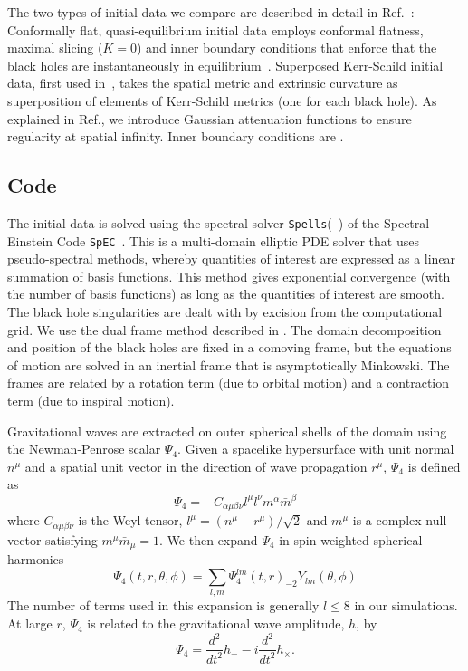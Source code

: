 The two types of initial data we compare are described in detail in
Ref.~\cite{Lovelace2008}: Conformally flat, quasi-equilibrium initial
data employs conformal flatness, maximal slicing ($K=0$) and inner
boundary conditions that enforce that the black holes are
instantaneously in
equilibrium~\cite{Caudill-etal:2006,Cook2004,Cook2002}.  Superposed
Kerr-Schild initial data, first used
in~\cite{Marronetti-Matzner:2000,Matzner1999}, takes the spatial
metric and extrinsic curvature as superposition of elements of
Kerr-Schild metrics (one for each black hole).  As explained in
Ref.\cite{Lovelace2008}, we introduce Gaussian attenuation functions
to ensure regularity at spatial infinity.  Inner boundary conditions
are .



\subsection{Code}
\label{sec:Code}

The initial data is solved using the spectral solver {\tt Spells}(~\cite{Pfeiffer2003}) of the Spectral 
 Einstein Code {\tt SpEC}~\cite{SXSWebsite}.  This is a
multi-domain elliptic PDE solver that uses pseudo-spectral methods,
whereby quantities of interest are expressed as a linear summation of
basis functions. This method gives exponential convergence (with the
number of basis functions) as long as the quantities of interest are
smooth. The black hole singularities are dealt with by excision from
the computational grid. We use the dual frame method described in
\cite{Scheel2006}. The domain decomposition and position of the black
holes are fixed in a comoving frame, but the equations of motion are
solved in an inertial frame that is asymptotically Minkowski. The
frames are related by a rotation term (due to orbital motion) and a
contraction term (due to inspiral motion).

Gravitational waves are extracted on outer spherical shells of the
domain using the Newman-Penrose scalar $\Psi_4$. Given a spacelike
hypersurface with unit normal $n^{\mu}$ and a spatial unit vector in
the direction of wave propagation $r^{\mu}$, $\Psi_4$ is defined as 
\begin{equation}
\Psi_4 = -C_{\alpha\mu\beta\nu}l^{\mu}l^{\nu}m^{\alpha}\bar{m}^{\beta}
\end{equation}
where $C_{\alpha\mu\beta\nu}$ is the Weyl tensor,
$l^{\mu}=\left(n^{\mu}-r^{\mu}\right)/\sqrt{2}$ and $m^{\mu}$ is a
complex null vector satisfying $m^{\mu}\bar{m}_{\mu}=1$. We then expand
$\Psi_4$ in spin-weighted spherical harmonics
\begin{equation}
\Psi_4(t,r,\theta,\phi)=\sum_{l,m}{\Psi_4^{lm}(t,r)_{-2}Y_{lm}(\theta,\phi)}
\end{equation}
The number of terms used in this expansion is generally $l\le 8$ in
our simulations. At large $r$, $\Psi_4$ is related to the
gravitational wave amplitude, $h$, by
\begin{equation}
\Psi_4=\frac{d^2}{dt^2}h_{+}-i\frac{d^2}{dt^2}h_{\times}.
\end{equation}



